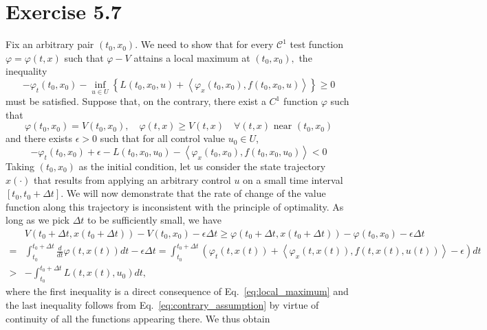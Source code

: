 \documentclass[11pt]{report}
\begin{document}
\section*{Exercise 5.7}
Fix an arbitrary pair $\left(t_{0}, x_{0}\right)$. We need to show that for every $\mathcal{C}^{1}$ test function $\varphi=\varphi(t, x)$ such that $\varphi-V$ attains a local maximum at $\left(t_{0}, x_{0}\right),$ the inequality
$$
-\varphi_{t}\left(t_{0}, x_{0}\right)-\inf _{u \in U}\left\{L\left(t_{0}, x_{0}, u\right)+\left\langle\varphi_{x}\left(t_{0}, x_{0}\right), f\left(t_{0}, x_{0}, u\right)\right\rangle\right\} \geq 0
$$
must be satisfied. Suppose that, on the contrary, there exist a $C^{1}$ function $\varphi$ such that
\begin{equation}
\varphi\left(t_{0}, x_{0}\right)=V\left(t_{0}, x_{0}\right), \quad \varphi(t, x) \geq V(t, x) \quad \forall(t, x) \text { near }\left(t_{0}, x_{0}\right)
\label{eq:local_maximum}
\end{equation}
and there exists $\epsilon > 0$ such that for all control value $u_{0} \in U$,
\begin{equation}
-\varphi_{t}\left(t_{0}, x_{0}\right) + \epsilon - L\left(t_{0}, x_{0}, u_{0}\right)-\left\langle\varphi_{x}\left(t_{0}, x_{0}\right), f\left(t_{0}, x_{0}, u_{0}\right)\right\rangle < 0
\label{eq:contrary_assumption}
\end{equation}
Taking $\left(t_{0}, x_{0}\right)$ as the initial condition, let us consider the state trajectory $x(\cdot)$ that results from applying an arbitrary control $u$ on a small time interval $\left[t_{0}, t_{0}+\Delta t\right]$. We will now demonstrate that the rate of change of the value function along this trajectory is inconsistent with the principle of optimality. As long as we pick $\Delta t$ to be sufficiently small, we have
$$
\begin{aligned}
& V\left(t_{0}+\Delta t, x\left(t_{0}+\Delta t\right)\right)-V\left(t_{0}, x_{0}\right) - \epsilon \Delta t \geq \varphi\left(t_{0}+\Delta t, x\left(t_{0}+\Delta t\right)\right)-\varphi\left(t_{0}, x_{0}\right) - \epsilon \Delta t\\
= & \int_{t_{0}}^{t_{0}+\Delta t} \frac{d}{d t} \varphi(t, x(t)) d t - \epsilon  \Delta t =\int_{t_{0}}^{t_{0}+\Delta t}\left(\varphi_{t}(t, x(t))+\left\langle\varphi_{x}(t, x(t)), f\left(t, x(t), u(t)\right)\right\rangle - \epsilon \right) d t\\ > & -\int_{t_{0}}^{t_{0}+\Delta t} L\left(t, x(t), u_{0}\right) d t,
\end{aligned}
$$
where the first inequality is a direct consequence of Eq.~\eqref{eq:local_maximum} and the last inequality follows from Eq.~\eqref{eq:contrary_assumption} by virtue of continuity of all the functions appearing there. We thus obtain
\end{document}
